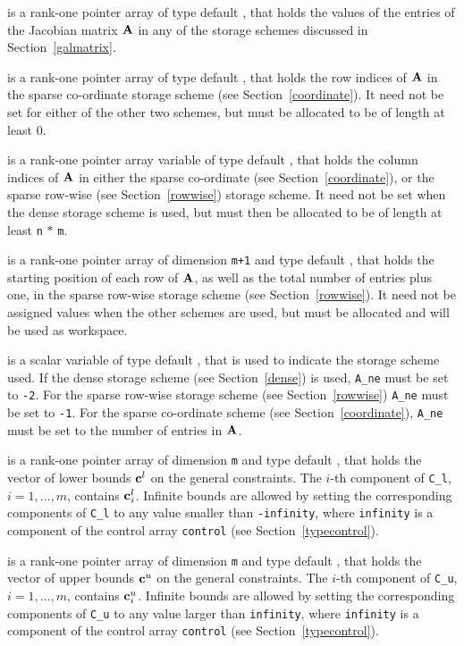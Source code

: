\documentclass{galahad}
\begin{document}
\begin{description}
 is a rank-one pointer array of type default \realdp, that holds
the values of the entries of the Jacobian matrix ${\mathbf{A}}$ in any of the
storage schemes discussed in Section~\ref{galmatrix}.

 is a rank-one pointer array of type default \integer,
that holds the row indices  of ${\mathbf{A}}$ in the sparse co-ordinate storage
scheme (see Section~\ref{coordinate}).
It need not be set for either of the other
two schemes, but must be allocated to be of length at least 0.

 is a rank-one pointer array variable of type default \integer,
that holds the column indices  of ${\mathbf{A}}$ in either the sparse co-ordinate
(see Section~\ref{coordinate}), or the sparse row-wise
(see Section~\ref{rowwise}) storage scheme.
It need not be set when the dense storage scheme is used,
but must then be allocated to be of length at least {\tt n} $\ast$ {\tt m}.

 is a rank-one pointer array of dimension {\tt m+1} and type
default \integer, that holds the
starting position of each row of ${\mathbf{A}}$, as well
as the total number of entries plus one, in the sparse row-wise storage
scheme (see Section~\ref{rowwise}). It need not be assigned values when the
other schemes are used, but must be allocated and will be used as
workspace.

 is a scalar variable of type default \integer, that is used to
indicate the storage scheme used. If the dense storage scheme
(see Section~\ref{dense}) is used, {\tt A\_ne} must be set to {\tt -2}.
For the sparse row-wise storage scheme (see Section~\ref{rowwise})
{\tt A\_ne} must be set to {\tt -1}.
For the sparse co-ordinate scheme (see Section~\ref{coordinate}),
{\tt A\_ne} must be set to the number of entries in ${\mathbf{A}}$.

 is a rank-one pointer array of dimension {\tt m} and type
default \realdp, that holds the vector of lower bounds ${\mathbf{c}}^{l}$
on the general constraints. The $i$-th component of
{\tt C\_l}, $i = 1, \ldots , m$, contains ${\mathbf{c}}_{i}^{l}$.
Infinite bounds are allowed by setting the corresponding
components of {\tt C\_l} to any value smaller than {\tt -infinity},
where {\tt infinity} is a component of the control array {\tt control}
(see Section~\ref{typecontrol}).

 is a rank-one pointer array of dimension {\tt m} and type
default \realdp, that holds the vector of upper bounds ${\mathbf{c}}^{u}$
on the general constraints. The $i$-th component of
{\tt C\_u}, $i = 1,  \ldots ,  m$, contains ${\mathbf{c}}_{i}^{u}$.
Infinite bounds are allowed by setting the corresponding
components of {\tt C\_u} to any value larger than {\tt infinity},
where {\tt infinity} is a component of the control array {\tt control}
(see Section~\ref{typecontrol}).


\end{description}
\end{document}
